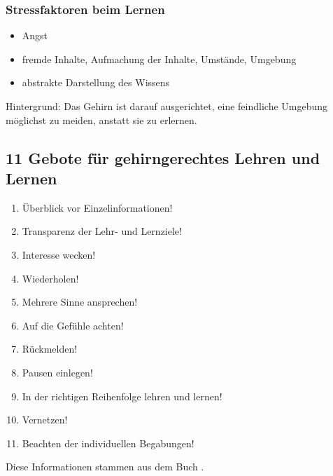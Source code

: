 \subsubsection{Stressfaktoren beim Lernen}
\begin{itemize}
  \item Angst
  \item fremde Inhalte, Aufmachung der Inhalte, Umstände, Umgebung
  \item abstrakte Darstellung des Wissens
\end{itemize}

Hintergrund: Das Gehirn ist darauf ausgerichtet, eine feindliche Umgebung möglichst zu meiden, anstatt sie zu erlernen.

\subsection{11 Gebote für gehirngerechtes Lehren und Lernen}
\begin{enumerate}
  \item Überblick vor Einzelinformationen!
  \item Transparenz der Lehr- und Lernziele!
  \item Interesse wecken!
  \item Wiederholen!
  \item Mehrere Sinne ansprechen!
  \item Auf die Gefühle achten!
  \item Rückmelden!
  \item Pausen einlegen!
  \item In der richtigen Reihenfolge lehren und lernen!
  \item Vernetzen!
  \item Beachten der individuellen Begabungen!
\end{enumerate}

Diese Informationen stammen aus dem Buch \cite{kopf}.